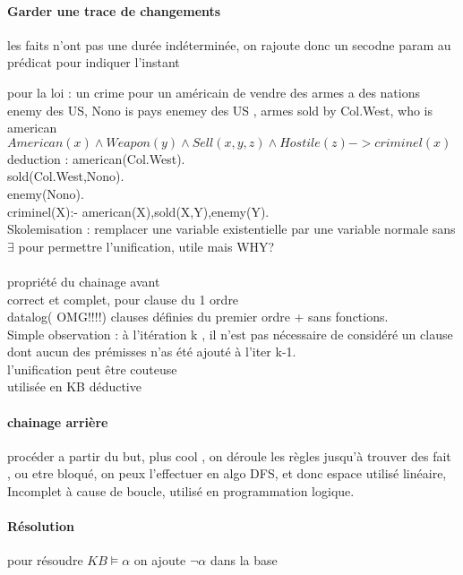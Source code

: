 \documentclass{article}
\begin{document}
\paragraph{Garder une trace de changements} les faits n'ont pas une durée indéterminée, on rajoute donc un secodne param au prédicat pour indiquer l'instant

pour la loi : un crime pour un américain de vendre des armes a des nations enemy des US, Nono is pays enemey des US , armes sold by Col.West, who is american\\

$ American(x) \wedge Weapon(y) \wedge Sell(x,y,z) \wedge Hostile(z) -> criminel(x)$
deduction : 
american(Col.West).\\
sold(Col.West,Nono).\\
enemy(Nono).\\
criminel(X):- american(X),sold(X,Y),enemy(Y).\\
Skolemisation : remplacer une variable existentielle par une variable normale sans $\exists$ pour permettre l'unification, utile mais WHY?
\paragraph{} propriété du chainage avant\\correct et complet, pour clause du 1 ordre\\
datalog( OMG!!!!) clauses définies du premier ordre + sans fonctions.\\
Simple observation  : à l'itération k , il n'est pas nécessaire de considéré un clause dont aucun des prémisses n'as été ajouté à l'iter k-1.\\
l'unification peut être couteuse\\utilisée en KB déductive

\paragraph{chainage arrière} procéder a partir du but, plus cool , on déroule les règles jusqu’à trouver des fait , ou etre bloqué, on peux l'effectuer en algo DFS, et donc espace utilisé linéaire, Incomplet à cause de boucle, utilisé en programmation logique.

\paragraph{Résolution} pour résoudre $KB\models \alpha$ on ajoute $\neg \alpha$ dans la base
\end{document}
